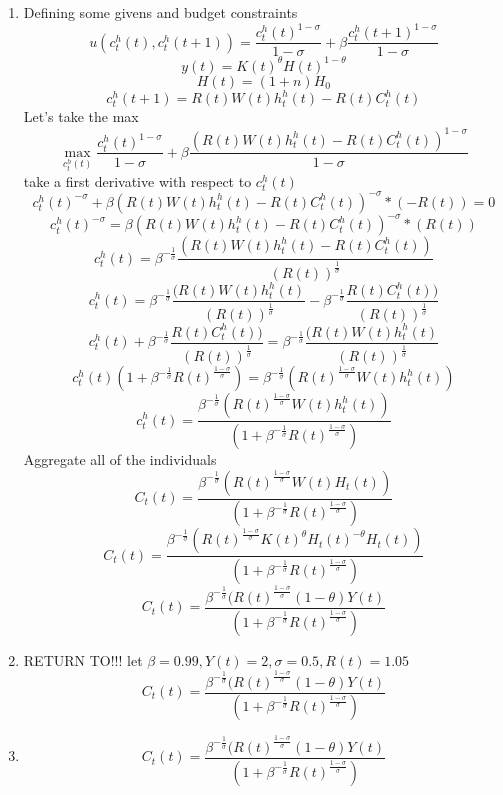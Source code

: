 \begin{enumerate}
    \item Defining some givens and budget constraints  $$u(c^h_t(t),c^h_t(t+1))=\frac{c^h_t(t)^{1-\sigma}}{1-\sigma}+\beta\frac{c^h_t(t+1)^{1-\sigma}}{1-\sigma}$$
    $$y(t)=K(t)^\theta H(t)^{1-\theta}$$
    $$H(t)=(1+n)H_0$$
    $$c_t^h(t+1) = R(t)W(t)h^h_t(t)-R(t)C_t^h(t)$$
    Let's take the max
    $$\max_{c^h_t(t)} \frac{c^h_t(t)^{1-\sigma}}{1-\sigma}+\beta\frac{( R(t)W(t)h^h_t(t)-R(t)C_t^h(t))^{1-\sigma}}{1-\sigma}$$
    take a first derivative with respect to $c_t^h(t)$
    $$c^h_t(t)^{-\sigma}+\beta( R(t)W(t)h^h_t(t)-R(t)C_t^h(t))^{-\sigma}*(-R(t))=0$$
    $$c^h_t(t)^{-\sigma}=\beta( R(t)W(t)h^h_t(t)-R(t)C_t^h(t))^{-\sigma}*(R(t))$$
    $$c^h_t(t)=\beta^{-\frac{1}{\sigma}}\frac{( R(t)W(t)h^h_t(t)-R(t)C_t^h(t))}{(R(t))^{\frac{1}{\sigma}}}$$
    $$c^h_t(t)=\beta^{-\frac{1}{\sigma}}\frac{( R(t)W(t)h^h_t(t)}{(R(t))^\frac{1}{\sigma}}-\beta^{-\frac{1}{\sigma}} \frac{R(t)C_t^h(t))}{(R(t))^{\frac{1}{\sigma}}}$$
    $$c^h_t(t)+\beta^{-\frac{1}{\sigma}} \frac{R(t)C_t^h(t))}{(R(t))^{\frac{1}{\sigma}}}=\beta^{-\frac{1}{\sigma}}\frac{( R(t)W(t)h^h_t(t)}{(R(t))^\frac{1}{\sigma}}$$    
    $$c^h_t(t)(1+\beta^{-\frac{1}{\sigma}} R(t)^{\frac{1-\sigma}{\sigma}})=\beta^{-\frac{1}{\sigma}}( R(t)^{\frac{1-\sigma}{\sigma}}W(t)h^h_t(t))$$
    $$c^h_t(t)=\frac{\beta^{-\frac{1}{\sigma}}( R(t)^{\frac{1-\sigma}{\sigma}}W(t)h^h_t(t))}{(1+\beta^{-\frac{1}{\sigma}} R(t)^{\frac{1-\sigma}{\sigma}})}$$
    Aggregate all of the individuals
    $$C_t(t)=\frac{\beta^{-\frac{1}{\sigma}}( R(t)^{\frac{1-\sigma}{\sigma}}W(t)H_t(t))}{(1+\beta^{-\frac{1}{\sigma}} R(t)^{\frac{1-\sigma}{\sigma}})} $$
    $$C_t(t)=\frac{\beta^{-\frac{1}{\sigma}}( R(t)^{\frac{1-\sigma}{\sigma}}K(t)^{\theta}H_t(t)^{-\theta}H_t(t))}{(1+\beta^{-\frac{1}{\sigma}} R(t)^{\frac{1-\sigma}{\sigma}})} $$
    $$C_t(t)=\frac{\beta^{-\frac{1}{\sigma}}( R(t)^{\frac{1-\sigma}{\sigma}}(1-\theta)Y(t)}{(1+\beta^{-\frac{1}{\sigma}} R(t)^{\frac{1-\sigma}{\sigma}})} $$
    \item RETURN TO!!!
    let $\beta=0.99, Y(t)=2, \sigma=0.5, R(t)=1.05$
     $$C_t(t)=\frac{\beta^{-\frac{1}{\sigma}}( R(t)^{\frac{1-\sigma}{\sigma}}(1-\theta)Y(t)}{(1+\beta^{-\frac{1}{\sigma}} R(t)^{\frac{1-\sigma}{\sigma}})} $$
    \item 
    $$C_t(t)=\frac{\beta^{-\frac{1}{\sigma}}( R(t)^{\frac{1-\sigma}{\sigma}}(1-\theta)Y(t)}{(1+\beta^{-\frac{1}{\sigma}} R(t)^{\frac{1-\sigma}{\sigma}})} $$
\end{enumerate}